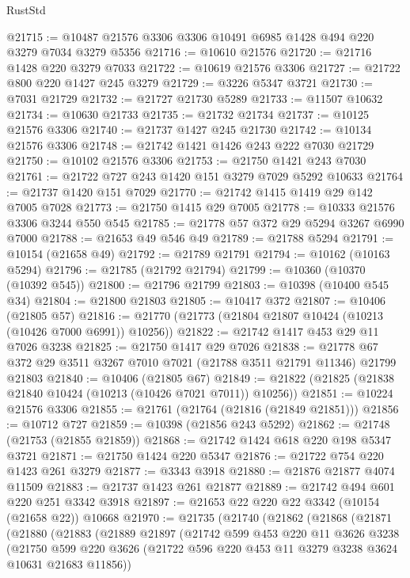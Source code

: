 \begin{lexlean}{RustStd}
\begin{coremodule}
{\begin{coremodule}
{{{{{{{{{{{{{{{{{{{{{{{{{{@21715 := @10487 @21576 @3306 @3306 @10491 @6985 @1428 @494 @220 @3279 @7034 @3279 @5356
@21716 := @10610 @21576
@21720 := @21716 @1428 @220 @3279 @7033
@21722 := @10619 @21576 @3306
@21727 := @21722 @800 @220 @1427 @245 @3279
@21729 := @3226 @5347 @3721
@21730 := @7031 @21729
@21732 := @21727 @21730 @5289
@21733 := @11507 @10632
@21734 := @10630 @21733
@21735 := @21732 @21734
@21737 := @10125 @21576 @3306
@21740 := @21737 @1427 @245 @21730
@21742 := @10134 @21576 @3306
@21748 := @21742 @1421 @1426 @243 @222 @7030 @21729
@21750 := @10102 @21576 @3306
@21753 := @21750 @1421 @243 @7030
@21761 := @21722 @727 @243 @1420 @151 @3279 @7029 @5292 @10633
@21764 := @21737 @1420 @151 @7029
@21770 := @21742 @1415 @1419 @29 @142 @7005 @7028
@21773 := @21750 @1415 @29 @7005
@21778 := @10333 @21576 @3306 @3244 @550 @545
@21785 := @21778 @57 @372 @29 @5294 @3267 @6990 @7000
@21788 := @21653 @49 @546 @49
@21789 := @21788 @5294
@21791 := @10154 (@21658 @49)
@21792 := @21789 @21791
@21794 := @10162 (@10163 @5294)
@21796 := @21785 (@21792 @21794)
@21799 := @10360 (@10370 (@10392 @545))
@21800 := @21796 @21799
@21803 := @10398 (@10400 @545 @34)
@21804 := @21800 @21803
@21805 := @10417 @372
@21807 := @10406 (@21805 @57)
@21816 := @21770 (@21773 (@21804 @21807 @10424 (@10213 (@10426 @7000 @6991)) @10256))
@21822 := @21742 @1417 @453 @29 @11 @7026 @3238
@21825 := @21750 @1417 @29 @7026
@21838 := @21778 @67 @372 @29 @3511 @3267 @7010 @7021 (@21788 @3511 @21791 @11346) @21799 @21803
@21840 := @10406 (@21805 @67)
@21849 := @21822 (@21825 (@21838 @21840 @10424 (@10213 (@10426 @7021 @7011)) @10256))
@21851 := @10224 @21576 @3306
@21855 := @21761 (@21764 (@21816 (@21849 @21851)))
@21856 := @10712 @727
@21859 := @10398 (@21856 @243 @5292)
@21862 := @21748 (@21753 (@21855 @21859))
@21868 := @21742 @1424 @618 @220 @198 @5347 @3721
@21871 := @21750 @1424 @220 @5347
@21876 := @21722 @754 @220 @1423 @261 @3279
@21877 := @3343 @3918
@21880 := @21876 @21877 @4074 @11509
@21883 := @21737 @1423 @261 @21877
@21889 := @21742 @494 @601 @220 @251 @3342 @3918
@21897 := @21653 @22 @220 @22 @3342 (@10154 (@21658 @22)) @10668
@21970 := @21735
    (@21740
      (@21862
        (@21868
          (@21871
            (@21880
              (@21883
                (@21889
                  @21897
                  (@21742
                    @599
                    @453
                    @220
                    @11
                    @3626
                    @3238
                    (@21750
                      @599
                      @220
                      @3626
                      (@21722 @596 @220 @453 @11 @3279 @3238 @3624 @10631 @21683 @11856))
}}}}}}}}}}}}}}}}}}}}}}}}}}
\end{coremodule}}
\end{coremodule}
\end{lexlean}
